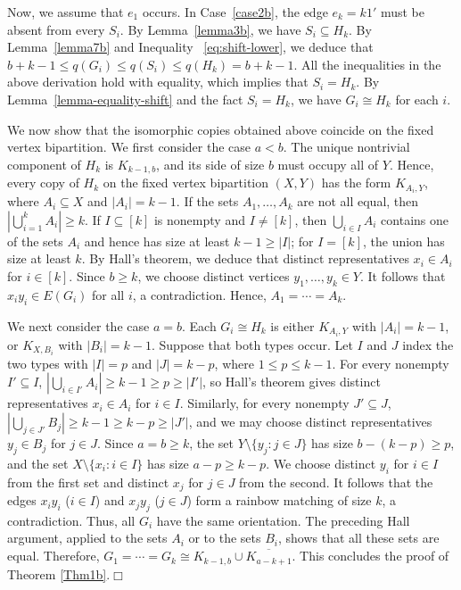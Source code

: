 \documentclass[11pt,a4paper]{article}
\theoremstyle{definition}
\numberwithin{equation}{section}
\def\qed{\hfill$\Box$\vspace{12pt}}
\begin{document}
Now, we assume that $e_1$ occurs. In Case~\ref{case2b}, the edge $e_k=k1'$ must be absent from every $S_i$. By Lemma~\ref{lemma3b}, we have $S_i\subseteq H_k$. By Lemma~\ref{lemma7b} and Inequality~ \eqref{eq:shift-lower}, we deduce that $b+k-1\le q(G_i)\le q(S_i)\le q(H_k)=b+k-1$. All the inequalities in the above derivation hold with equality, which implies that $S_i=H_k$. By Lemma~\ref{lemma-equality-shift} and the fact $S_i=H_k$, we have $G_i\cong H_k$ for each $i$.

We now show that the isomorphic copies obtained above coincide on the fixed vertex bipartition. We first consider the case $a<b$. The unique nontrivial component of $H_k$ is $K_{k-1,b}$, and its side of size $b$ must occupy all of $Y$. Hence, every copy of $H_k$ on the fixed vertex bipartition $(X,Y)$ has the form $K_{A_i,Y}$, where $A_i\subseteq X$ and $|A_i|=k-1$. If the sets $A_1,\ldots,A_k$ are not all equal, then $|\bigcup_{i=1}^kA_i|\ge k$. If $I\subseteq[k]$ is nonempty and $I\ne[k]$, then $\bigcup_{i\in I}A_i$ contains one of the sets $A_i$ and hence has size at least $k-1\ge|I|$; for $I=[k]$, the union has size at least $k$. By Hall's theorem, we deduce that distinct representatives $x_i\in A_i$ for $i\in[k]$. Since $b\ge k$, we choose distinct vertices $y_1,\ldots,y_k\in Y$. It follows that $x_iy_i\in E(G_i)$ for all $i$, a contradiction. Hence, $A_1=\cdots=A_k$.

We next consider the case $a=b$. Each $G_i\cong H_k$ is either $K_{A_i,Y}$ with $|A_i|=k-1$, or $K_{X,B_i}$ with $|B_i|=k-1$. Suppose that both types occur. Let $I$ and $J$ index the two types with $|I|=p$ and $|J|=k-p$, where $1\le p\le k-1$. For every nonempty $I'\subseteq I$, $\left|\bigcup_{i\in I'}A_i\right|\ge k-1\ge p\ge|I'|$, so Hall's theorem gives distinct representatives $x_i\in A_i$ for $i\in I$. Similarly, for every nonempty $J'\subseteq J$, $\left|\bigcup_{j\in J'}B_j\right|\ge k-1\ge k-p\ge|J'|$, and we may choose distinct representatives $y_j\in B_j$ for $j\in J$. Since $a=b\ge k$, the set $Y\setminus\{y_j:j\in J\}$ has size $b-(k-p)\ge p$, and the set $X\setminus\{x_i:i\in I\}$ has size $a-p\ge k-p$. We choose distinct $y_i$ for $i\in I$ from the first set and distinct $x_j$ for $j\in J$ from the second. It follows that the edges $x_iy_i$ ($i\in I$) and $x_jy_j$ ($j\in J$) form a rainbow matching of size $k$, a contradiction. Thus, all $G_i$ have the same orientation. The preceding Hall argument, applied to the sets $A_i$ or to the sets $B_i$, shows that all these sets are equal. Therefore, $G_1=\cdots=G_k\cong K_{k-1,b}\cup\overline{K_{a-k+1}}$. This concludes the proof of Theorem \ref{Thm1b}.\qed
\end{document}
